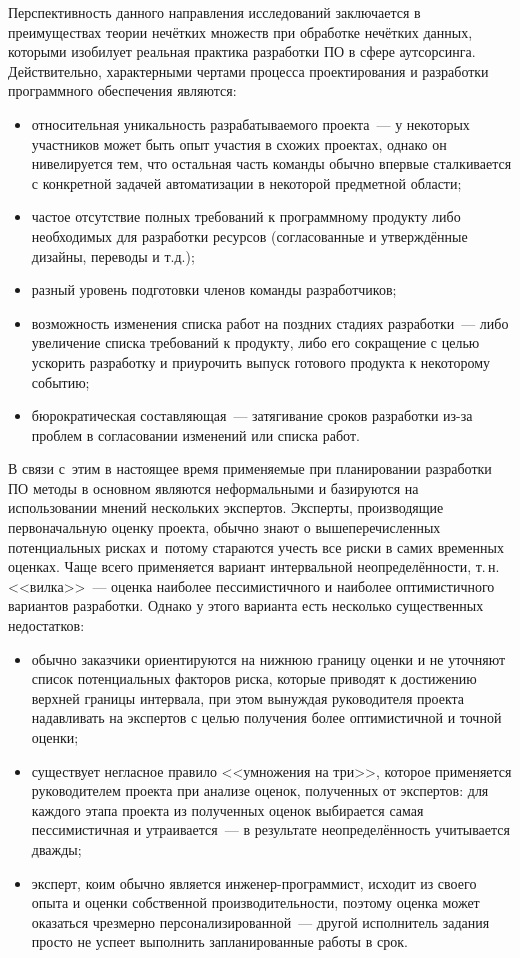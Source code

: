Перспективность данного направления исследований заключается в преимуществах теории нечётких множеств при обработке нечётких данных, которыми изобилует реальная практика разработки ПО в сфере аутсорсинга. Действительно, характерными чертами процесса проектирования и разработки программного обеспечения являются:
\begin{itemize}
  \item относительная уникальность разрабатываемого проекта~--- у некоторых участников может быть опыт участия в схожих проектах, однако он нивелируется тем, что остальная часть команды обычно впервые сталкивается с конкретной задачей автоматизации в некоторой предметной области;
  \item частое отсутствие полных требований к программному продукту либо необходимых для разработки ресурсов (согласованные и утверждённые дизайны, переводы и т.д.);
  \item разный уровень подготовки членов команды разработчиков;
  \item возможность изменения списка работ на поздних стадиях разработки~--- либо увеличение списка требований к продукту, либо его сокращение с целью ускорить разработку и приурочить выпуск готового продукта к некоторому событию;
  \item бюрократическая составляющая~--- затягивание сроков разработки из-за проблем в согласовании изменений или списка работ.
\end{itemize}

В связи с~этим в настоящее время применяемые при планировании разработки ПО методы в основном являются неформальными и базируются на использовании мнений нескольких экспертов. Эксперты, производящие первоначальную оценку проекта, обычно знают о вышеперечисленных потенциальных рисках и~потому стараются учесть все риски в самих временных оценках. Чаще всего применяется вариант интервальной неопределённости, т.\,н. <<вилка>>~--- оценка наиболее пессимистичного и наиболее оптимистичного вариантов разработки. Однако у этого варианта есть несколько существенных недостатков:
\begin{itemize}
  \item обычно заказчики ориентируются на нижнюю границу оценки и не уточняют список потенциальных факторов риска, которые приводят к достижению верхней границы интервала, при этом вынуждая руководителя проекта надавливать на экспертов с целью получения более оптимистичной и точной оценки;
  \item существует негласное правило <<умножения на три>>, которое применяется руководителем проекта при анализе оценок, полученных от экспертов: для каждого этапа проекта из полученных оценок выбирается самая пессимистичная и утраивается~--- в результате неопределённость учитывается дважды; 
  \item эксперт, коим обычно является инженер-программист, исходит из своего опыта и оценки собственной производительности, поэтому оценка может оказаться чрезмерно персонализированной~--- другой исполнитель задания просто не успеет выполнить запланированные работы в срок.
\end{itemize}

